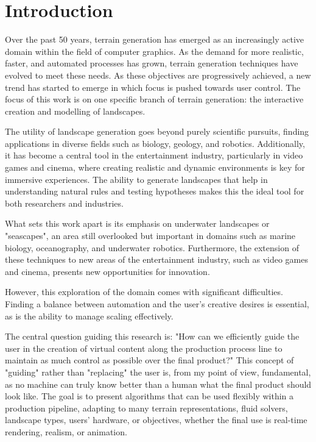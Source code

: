 \chapter{Introduction}
\label{chap:introduction}


Over the past 50 years, terrain generation has emerged as an increasingly active domain within the field of computer graphics. As the demand for more realistic, faster, and automated processes has grown, terrain generation techniques have evolved to meet these needs. As these objectives are progressively achieved, a new trend has started to emerge in which focus is pushed towards user control. The focus of this work is on one specific branch of terrain generation: the interactive creation and modelling of landscapes.

The utility of landscape generation goes beyond purely scientific pursuits, finding applications in diverse fields such as biology, geology, and robotics. Additionally, it has become a central tool in the entertainment industry, particularly in video games and cinema, where creating realistic and dynamic environments is key for immersive experiences. The ability to generate landscapes that help in understanding natural rules and testing hypotheses makes this the ideal tool for both researchers and industries.

What sets this work apart is its emphasis on underwater landscapes or "seascapes", an area still overlooked but important in domains such as marine biology, oceanography, and underwater robotics. Furthermore, the extension of these techniques to new areas of the entertainment industry, such as video games and cinema, presents new opportunities for innovation.

However, this exploration of the domain comes with significant difficulties. Finding a balance between automation and the user's creative desires is essential, as is the ability to manage scaling effectively.

The central question guiding this research is: "How can we efficiently guide the user in the creation of virtual content along the production process line to maintain as much control as possible over the final product?" This concept of "guiding" rather than "replacing" the user is, from my point of view, fundamental, as no machine can truly know better than a human what the final product should look like. The goal is to present algorithms that can be used flexibly within a production pipeline, adapting to many terrain representations, fluid solvers, landscape types, users' hardware, or objectives, whether the final use is real-time rendering, realism, or animation.

